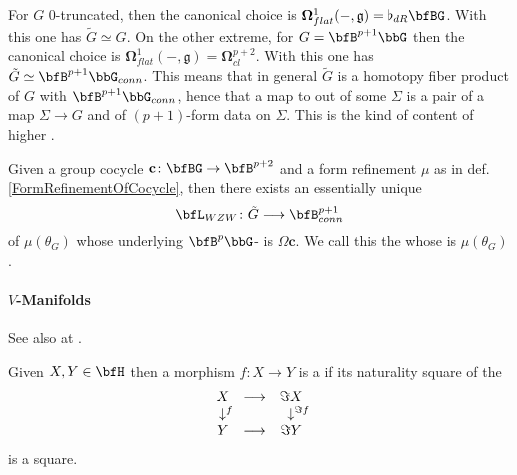 \begin{example}
\label{}\hypertarget{}{}
For $G$ 0-truncated, then the canonical choice is $\mathbf{\Omega}^1_{flat}(-,\mathfrak{g}) = \flat_{dR}\bfBG$. With this one has $\tilde G \simeq G$.
On the other extreme, for $G = \bfB^{p+1}\bbG$ then the canonical choice is $\mathbf{\Omega}^1_{flat}(-,\mathfrak{g}) = \mathbf{\Omega}^{p+2}_{cl}$. With this one has $\tilde G \simeq \bfB^{p+1}\bbG_{conn}$.
This means that in general $\tilde G$ is a homotopy fiber product of $G$ with $\bfB^{p+1}\bbG_{conn}$, hence that a map to out of some $\Sigma$ is a pair of a map $\Sigma \to G$ and of $(p+1)$-form data on $\Sigma$. This is the kind of  content of higher .
\end{example}
\begin{prop}
\label{WZWTermFromCocycle}\hypertarget{WZWTermFromCocycle}{}
Given a group cocycle $\mathbf{c} \colon \bfBG \to \bfB^{p+2}$ and a form refinement $\mu$ as in def. \ref{FormRefinementOfCocycle}, then there exists an essentially unique 
\begin{displaymath}
\bfL_{WZW}
\colon
\tilde G \longrightarrow \bfB^{p+1}_{conn}
\end{displaymath}
of $\mu(\theta_G)$ whose underlying $\bfB^p\bbG$- is $\Omega \mathbf{c}$.
We call this the  whose  is $\mu(\theta_G)$.
\end{prop}
\hypertarget{Manifolds}{}\paragraph*{{$V$-Manifolds}}\label{Manifolds}
See also at .
\begin{defn}
\label{LocalDiffeomorphisms}\hypertarget{LocalDiffeomorphisms}{}
Given $X,Y\in \bfH$ then a morphism $f \colon X\longrightarrow Y$ is a  if its naturality square of the 
\begin{displaymath}
\itexarray{
X &\longrightarrow& \Im X
\\
\downarrow^{\mathrlap{f}} && \downarrow^{\mathrlap{\Im f}}
\\
Y &\longrightarrow& \Im Y
}
\end{displaymath}
is a  square.
\end{defn}
